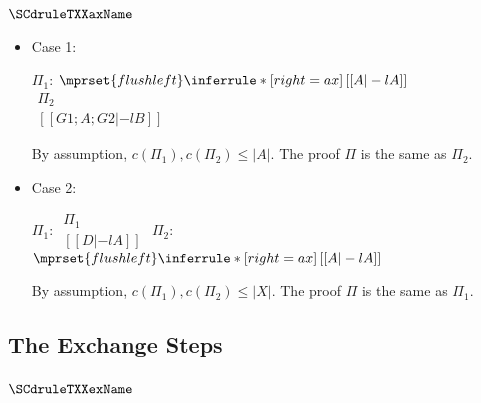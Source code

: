 \subsubsection{$\SCdruleTXXaxName$}
\begin{itemize}
\item Case 1:
      \begin{center}
        \scriptsize
        $\Pi_1$:
        \begin{math}
          $$\mprset{flushleft}
          \inferrule* [right={\tiny ax}] {
            \,
          }{[[A |-l A]]}
        \end{math}
        \qquad\qquad
        \begin{math}
          \begin{array}{c}
            \Pi_2 \\
            {[[G1; A; G2 |-l B]]}
          \end{array}
        \end{math}
      \end{center}
      By assumption, $c(\Pi_1),c(\Pi_2)\leq |A|$. The proof $\Pi$ is the
      same as $\Pi_2$.

\item Case 2:
      \begin{center}
        \scriptsize
        $\Pi_1$:
        \begin{math}
          \begin{array}{c}
            \Pi_1 \\
            {[[D |-l A]]}
          \end{array}
        \end{math}
        \qquad\qquad
        $\Pi_2$:
        \begin{math}
          $$\mprset{flushleft}
          \inferrule* [right={\tiny ax}] {
            \,
          }{[[A |-l A]]}
        \end{math}
      \end{center}
      By assumption, $c(\Pi_1),c(\Pi_2)\leq |X|$. The proof $\Pi$ is the
      same as $\Pi_1$.
\end{itemize}



\subsection{The Exchange Steps}

\subsubsection{$\SCdruleTXXexName$}

